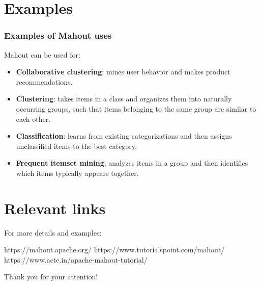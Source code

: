 \documentclass{beamer}
\begin{document}
\section{Examples}

\begin{frame}
\frametitle{Examples of Mahout uses}
Mahout can be used for:
\begin{itemize}
	\item \textbf{Collaborative clustering}: mines user behavior and makes product recommendations.\\
	\item \textbf{Clustering}: takes items in a class and organizes them into naturally occurring groups, such that items belonging to the same group are similar to each other.\\
	\item \textbf{Classification}: learns from existing categorizations and then assigns unclassified items to the best category.\\
	\item \textbf{Frequent itemset mining}: analyzes items in a group and then identifies which items typically appears together.
\end{itemize}
\end{frame}


\section{Relevant links}

\begin{frame}
For more details and examples:
\begin{thebibliography}{00}
	 https://mahout.apache.org/
	 https://www.tutorialspoint.com/mahout/
	 https://www.acte.in/apache-mahout-tutorial/
\end{thebibliography}
\end{frame}

\begin{frame}
\begin{center}
	{\huge Thank you for your attention!}
\end{center}
\end{frame}
\end{document}

